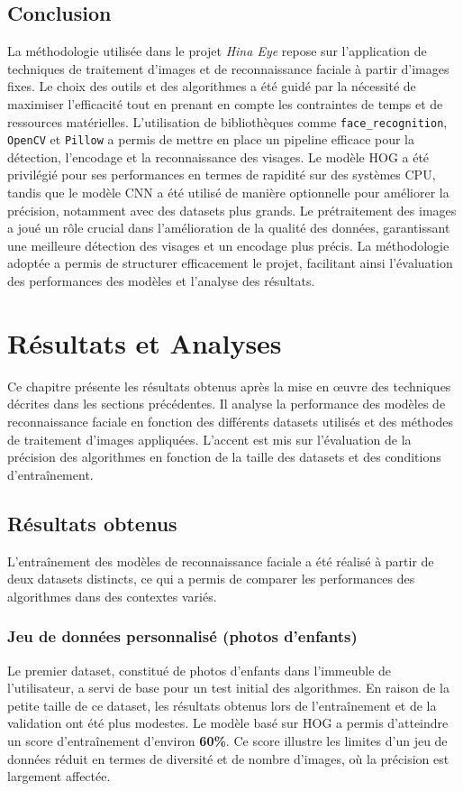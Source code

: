 \documentclass[a4paper,12pt]{report}
\begin{document}
\section{Conclusion}
La méthodologie utilisée dans le projet \textit{Hina Eye} repose sur l'application de techniques de traitement d'images et de reconnaissance faciale à partir d'images fixes. Le choix des outils et des algorithmes a été guidé par la nécessité de maximiser l'efficacité tout en prenant en compte les contraintes de temps et de ressources matérielles. L’utilisation de bibliothèques comme \texttt{face\_recognition}, \texttt{OpenCV} et \texttt{Pillow} a permis de mettre en place un pipeline efficace pour la détection, l'encodage et la reconnaissance des visages.
Le modèle HOG a été privilégié pour ses performances en termes de rapidité sur des systèmes CPU, tandis que le modèle CNN a été utilisé de manière optionnelle pour améliorer la précision, notamment avec des datasets plus grands. Le prétraitement des images a joué un rôle crucial dans l'amélioration de la qualité des données, garantissant une meilleure détection des visages et un encodage plus précis. La méthodologie adoptée a permis de structurer efficacement le projet, facilitant ainsi l’évaluation des performances des modèles et l’analyse des résultats.

\chapter{Résultats et Analyses}
Ce chapitre présente les résultats obtenus après la mise en œuvre des techniques décrites dans les sections précédentes. Il analyse la performance des modèles de reconnaissance faciale en fonction des différents datasets utilisés et des méthodes de traitement d'images appliquées. L'accent est mis sur l'évaluation de la précision des algorithmes en fonction de la taille des datasets et des conditions d'entraînement.

\section{Résultats obtenus}
L’entraînement des modèles de reconnaissance faciale a été réalisé à partir de deux datasets distincts, ce qui a permis de comparer les performances des algorithmes dans des contextes variés.

\subsection{Jeu de données personnalisé (photos d'enfants)}
Le premier dataset, constitué de photos d'enfants dans l’immeuble de l’utilisateur, a servi de base pour un test initial des algorithmes. En raison de la petite taille de ce dataset, les résultats obtenus lors de l'entraînement et de la validation ont été plus modestes. Le modèle basé sur HOG a permis d’atteindre un score d'entraînement d’environ \textbf{60\%}. Ce score illustre les limites d’un jeu de données réduit en termes de diversité et de nombre d’images, où la précision est largement affectée.
\end{document}
